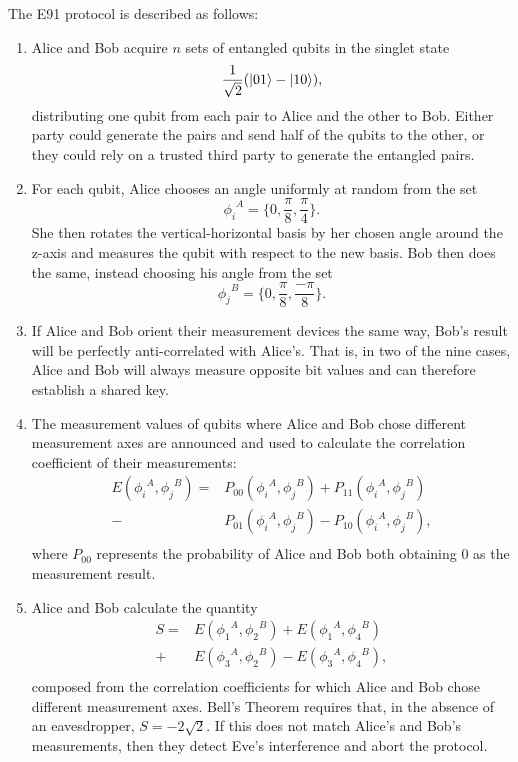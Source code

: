 \documentclass[conference]{IEEEtran}
\begin{document}
The E91 protocol is described as follows\cite{E91}:
\begin{enumerate}
\item Alice and Bob acquire $n$ sets of entangled qubits in the singlet state \[ \frac{1}{\sqrt{2}}(\left\vert{01}\right\rangle - \left\vert{10}\right\rangle), \] distributing one qubit from each pair to Alice and the other to Bob. Either party could generate the pairs and send half of the qubits to the other, or they could rely on a trusted third party to generate the entangled pairs.
\item For each qubit, Alice chooses an angle uniformly at random from the set \[ {\phi_i}^A = \{0, \frac{\pi}{8}, \frac{\pi}{4}\}. \]She then rotates the vertical-horizontal basis by her chosen angle around the z-axis and measures the qubit with respect to the new basis. Bob then does the same, instead choosing his angle from the set \[ {\phi_j}^B = \{0, \frac{\pi}{8}, \frac{-\pi}{8}\}. \]
\item If Alice and Bob orient their measurement devices the same way, Bob's result will be perfectly anti-correlated with Alice's. That is, in two of the nine cases, Alice and Bob will always measure opposite bit values and can therefore establish a shared key.
\item The measurement values of qubits where Alice and Bob chose different measurement axes are announced and used to calculate the correlation coefficient of their measurements:
  \begin{equation*}
    \begin{split}
      E({\phi_i}^A, {\phi_j}^B) = &P_{00}({\phi_i}^A,{\phi_j}^B) + P_{11}({\phi_i}^A,{\phi_j}^B)\\
      - &P_{01}({\phi_i}^A,{\phi_j}^B) - P_{10}({\phi_i}^A,{\phi_j}^B),\\
    \end{split}
  \end{equation*}
  where $P_{00}$ represents the probability of Alice and Bob both obtaining 0 as the measurement result.
\item Alice and Bob calculate the quantity
  \begin{equation*}
    \begin{split}
      S = &E({\phi_1}^A,{\phi_2}^B) + E({\phi_1}^A,{\phi_4}^B)\\
      + &E({\phi_3}^A,{\phi_2}^B) - E({\phi_3}^A,{\phi_4}^B),\\
    \end{split}
  \end{equation*}
  composed from the correlation coefficients for which Alice and Bob chose different measurement axes. Bell's Theorem requires that, in the absence of an eavesdropper, $S=-2\sqrt{2}$\cite{Clauser}. If this does not match Alice's and Bob's measurements, then they detect Eve's interference and abort the protocol.\\
\end{enumerate}
\end{document}
